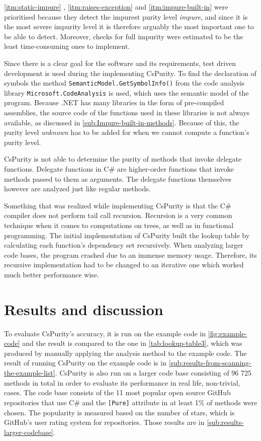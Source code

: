 \documentclass[a4paper,12pt]{article}
\newcommand{\Autoref}[1]{%
  \begingroup%
  \def\chapterautorefname{Chapter}%
  \def\sectionautorefname{Section}%
  \def\subsectionautorefname{Subsection}%
  \def\itemautorefname{Item}%
  \autoref{#1}%
  \endgroup%
}
\begin{document}
\Autoref{itm:static-impure}, \ref{itm:raises-exception} and \ref{itm:impure-built-in} were prioritised because they detect the impurest purity level \textit{impure}, and since it is the most severe impurity level it is therefore arguably the most important one to be able to detect. Moreover, checks for full impurity were estimated to be the least time-consuming ones to implement.

Since there is a clear goal for the software and its requirements, test driven development is used during the implementing CsPurity. To find the declaration of symbols the method \texttt{SemanticModel.GetSymbolInfo()} from the code analysis library \texttt{Microsoft.CodeAnalysis} is used, which uses the semantic model of the program. Because .NET has many libraries in the form of pre-compiled assemblies, the source code of the functions used in these libraries is not always available, as discussed in \autoref{sub:Impure-built-in-methods}. Because of this, the purity level \textit{unknown} has to be added for when we cannot compute a function's purity level.

CsPurity is not able to determine the purity of methods that invoke delegate functions. Delegate functions in C\# are higher-order functions that invoke methods passed to them as arguments. The delegate functions themselves however are analyzed just like regular methods.

Something that was realized while implementing CsPurity is that the C\# compiler does not perform tail call recursion. Recursion is a very common technique when it comes to computations on trees, as well as in functional programming. The initial implementation of CsPurity built the lookup table by calculating each function's dependency set recursively. When analyzing larger code bases, the program crashed due to an immense memory usage. Therefore, its recursive implementation had to be changed to an iterative one which worked much better performance wise.

\section{Results and discussion} \label{sec:results-and-discussion}

To evaluate CsPurity's accuracy, it is run on the example code in \autoref{fig:example-code} and the result is compared to the one in \autoref{tab:lookup-table3}, which was produced by manually applying the analysis method to the example code. The result of running CsPurity on the example code is in \autoref{sub:results-from-scanning-the-example-list}. CsPurity is also run on a larger code base consisting of 96 725 methods in total in order to evaluate its performance in real life, non-trivial, cases. The code base consists of the 11 most popular open source GitHub repositories that use C\# and the \texttt{[Pure]} attribute in at least 1\% of methods were chosen. The popularity is measured based on the number of stars, which is GitHub's user rating system for repositories. Those results are in \autoref{sub:results-larger-codebase}.
\end{document}
